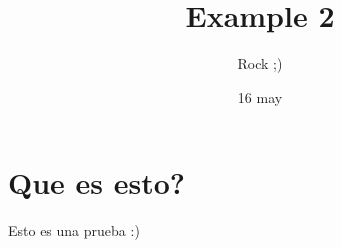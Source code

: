 \documentclass[a4paper,l1pt]{article}
\begin{document}
\title{Example 2}
\author{Rock ;)}
\date{16 may}
\maketitle
\section{Que es esto?}
Esto es una prueba :)
\end{document}
